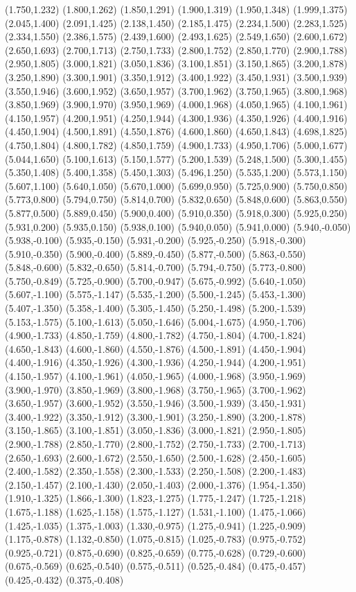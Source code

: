 (1.750,1.232) (1.800,1.262) (1.850,1.291) (1.900,1.319) (1.950,1.348) (1.999,1.375) (2.045,1.400) (2.091,1.425) (2.138,1.450) (2.185,1.475) (2.234,1.500) (2.283,1.525) (2.334,1.550) (2.386,1.575) (2.439,1.600) (2.493,1.625) (2.549,1.650) (2.600,1.672) (2.650,1.693) (2.700,1.713) (2.750,1.733) (2.800,1.752) (2.850,1.770) (2.900,1.788) (2.950,1.805) (3.000,1.821) (3.050,1.836) (3.100,1.851) (3.150,1.865) (3.200,1.878) (3.250,1.890) (3.300,1.901) (3.350,1.912) (3.400,1.922) (3.450,1.931) (3.500,1.939) (3.550,1.946) (3.600,1.952) (3.650,1.957) (3.700,1.962) (3.750,1.965) (3.800,1.968) (3.850,1.969) (3.900,1.970) (3.950,1.969) (4.000,1.968) (4.050,1.965) (4.100,1.961) (4.150,1.957) (4.200,1.951) (4.250,1.944) (4.300,1.936) (4.350,1.926) (4.400,1.916) (4.450,1.904) (4.500,1.891) (4.550,1.876) (4.600,1.860) (4.650,1.843) (4.698,1.825) (4.750,1.804) (4.800,1.782) (4.850,1.759) (4.900,1.733) (4.950,1.706) (5.000,1.677) (5.044,1.650) (5.100,1.613) (5.150,1.577) (5.200,1.539) (5.248,1.500) (5.300,1.455) (5.350,1.408) (5.400,1.358) (5.450,1.303) (5.496,1.250) (5.535,1.200) (5.573,1.150) (5.607,1.100) (5.640,1.050) (5.670,1.000) (5.699,0.950) (5.725,0.900) (5.750,0.850) (5.773,0.800) (5.794,0.750) (5.814,0.700) (5.832,0.650) (5.848,0.600) (5.863,0.550) (5.877,0.500) (5.889,0.450) (5.900,0.400) (5.910,0.350) (5.918,0.300) (5.925,0.250) (5.931,0.200) (5.935,0.150) (5.938,0.100) (5.940,0.050) (5.941,0.000) (5.940,-0.050) (5.938,-0.100) (5.935,-0.150) (5.931,-0.200) (5.925,-0.250) (5.918,-0.300) (5.910,-0.350) (5.900,-0.400) (5.889,-0.450) (5.877,-0.500) (5.863,-0.550) (5.848,-0.600) (5.832,-0.650) (5.814,-0.700) (5.794,-0.750) (5.773,-0.800) (5.750,-0.849) (5.725,-0.900) (5.700,-0.947) (5.675,-0.992) (5.640,-1.050) (5.607,-1.100) (5.575,-1.147) (5.535,-1.200) (5.500,-1.245) (5.453,-1.300) (5.407,-1.350) (5.358,-1.400) (5.305,-1.450) (5.250,-1.498) (5.200,-1.539) (5.153,-1.575) (5.100,-1.613) (5.050,-1.646) (5.004,-1.675) (4.950,-1.706) (4.900,-1.733) (4.850,-1.759) (4.800,-1.782) (4.750,-1.804) (4.700,-1.824) (4.650,-1.843) (4.600,-1.860) (4.550,-1.876) (4.500,-1.891) (4.450,-1.904) (4.400,-1.916) (4.350,-1.926) (4.300,-1.936) (4.250,-1.944) (4.200,-1.951) (4.150,-1.957) (4.100,-1.961) (4.050,-1.965) (4.000,-1.968) (3.950,-1.969) (3.900,-1.970) (3.850,-1.969) (3.800,-1.968) (3.750,-1.965) (3.700,-1.962) (3.650,-1.957) (3.600,-1.952) (3.550,-1.946) (3.500,-1.939) (3.450,-1.931) (3.400,-1.922) (3.350,-1.912) (3.300,-1.901) (3.250,-1.890) (3.200,-1.878) (3.150,-1.865) (3.100,-1.851) (3.050,-1.836) (3.000,-1.821) (2.950,-1.805) (2.900,-1.788) (2.850,-1.770) (2.800,-1.752) (2.750,-1.733) (2.700,-1.713) (2.650,-1.693) (2.600,-1.672) (2.550,-1.650) (2.500,-1.628) (2.450,-1.605) (2.400,-1.582) (2.350,-1.558) (2.300,-1.533) (2.250,-1.508) (2.200,-1.483) (2.150,-1.457) (2.100,-1.430) (2.050,-1.403) (2.000,-1.376) (1.954,-1.350) (1.910,-1.325) (1.866,-1.300) (1.823,-1.275) (1.775,-1.247) (1.725,-1.218) (1.675,-1.188) (1.625,-1.158) (1.575,-1.127) (1.531,-1.100) (1.475,-1.066) (1.425,-1.035) (1.375,-1.003) (1.330,-0.975) (1.275,-0.941) (1.225,-0.909) (1.175,-0.878) (1.132,-0.850) (1.075,-0.815) (1.025,-0.783) (0.975,-0.752) (0.925,-0.721) (0.875,-0.690) (0.825,-0.659) (0.775,-0.628) (0.729,-0.600) (0.675,-0.569) (0.625,-0.540) (0.575,-0.511) (0.525,-0.484) (0.475,-0.457) (0.425,-0.432) (0.375,-0.408) 